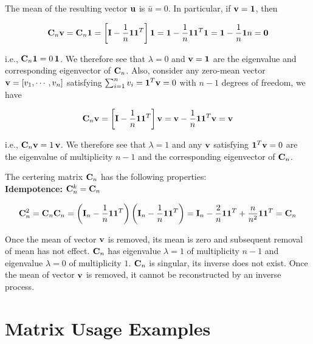 \documentclass[10pt,b5paper,titlepage]{book}
\begin{document}
The mean of the resulting vector ${\bf u}$ is $\bar{u}=0$. In particular, if ${\bf v}={\bf 1}$, then

\begin{equation}
    {\bf C}_n{\bf v} = {\bf C}_n{\bf 1}
    = \left[{\bf I}-\frac{1}{n}{\bf 1}{\bf 1}^T \right] {\bf 1}
    = {\bf 1} - \frac{1}{n} {\bf 11}^T {\bf 1}
    = {\bf 1} - \frac{1}{n} {\bf 1} n = {\bf0}
\end{equation}

i.e., ${\bf C}_n{\bf 1}=0\,{\bf 1}$. We therefore see that $\lambda=0$ and
${\bf v}={\bf 1}$ are the eigenvalue and corresponding eigenvector of ${\bf C}_n$.
Also, consider any zero-mean vector ${\bf v}=[v_1,\cdots,v_n]$ satisfying
$\sum_{i=1}^n v_i={\bf 1}^T{\bf v}=0$ with $n-1$ degrees of freedom, we have

\begin{equation}
    {\bf C}_n{\bf v}=\left[{\bf I}-\frac{1}{n}{\bf 11}^T\right]{\bf v}
  ={\bf v}-\frac{1}{n}{\bf 1}{\bf 1}^T{\bf v}={\bf v}
\end{equation}

i.e., ${\bf C}_n{\bf v}=1\,{\bf v}$. We therefore see that $\lambda=1$ and any
${\bf v}$ satisfying ${\bf 1}^T{\bf v}=0$ are the eigenvalue of multiplicity
$n-1$ and the corresponding eigenvector of ${\bf C}_n$.

The certering matrix ${\bf C}_n$ has the following properties: \\

\textbf{Idempotence:} ${\bf C}_n^k={\bf C}_n$

\begin{equation}
    {\bf C}_n^2={\bf C}_n{\bf C}_n=
    \left( {\bf I}_n-\frac{1}{n}{\bf 1}{\bf 1}^T \right)
    \left( {\bf I}_n-\frac{1}{n}{\bf 1}{\bf 1}^T \right)
    = {\bf I}_n-\frac{2}{n}{\bf 1}{\bf 1}^T+\frac{n}{n^2}{\bf 11}^T={\bf C}_n
\end{equation}

Once the mean of vector ${\bf v}$ is removed, its mean is zero and subsequent
removal of mean has not effect. ${\bf C}_n$ has eigenvalue $\lambda=1$ of
multiplicity $n-1$ and eigenvalue $\lambda=0$ of multiplicity $1$.
${\bf C}_n$ is singular, its inverse does not exist. Once the mean of vector
${\bf v}$ is removed, it cannot be reconstructed by an inverse process.






\chapter{Matrix Usage Examples}
\end{document}
